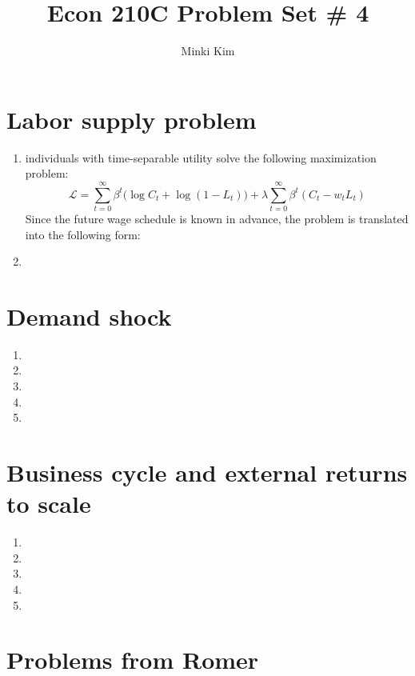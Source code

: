 \documentclass[11pt]{amsart}
\title{Econ 210C Problem Set \# 4}
\author{Minki Kim}
\begin{document}
\maketitle

\section{Labor supply problem}
\begin{enumerate}[label=(\alph*)]
	\item individuals with time-separable utility solve the following maximization problem: 
	\begin{equation*}
	\mathcal{L} = \sum_{t=0}^{\infty} \beta^t \bigg( \log C_t + \log (1-L_t) \bigg) + \lambda \sum_{t=0}^{\infty} \beta^t \left( C_t - w_t L_t \right)
	\end{equation*}
	Since the future wage schedule is known in advance, the problem is translated into the following form:
	\item
\end{enumerate}
\section{Demand shock}
\begin{enumerate}[label=(\alph*)]
	\item 
	\item
	\item
	\item
	\item
\end{enumerate}
\section{Business cycle and external returns to scale}
\begin{enumerate}[label=(\alph*)]
	\item 
	\item
	\item
	\item
	\item
\end{enumerate}
\section{Problems from Romer}
\end{document}

